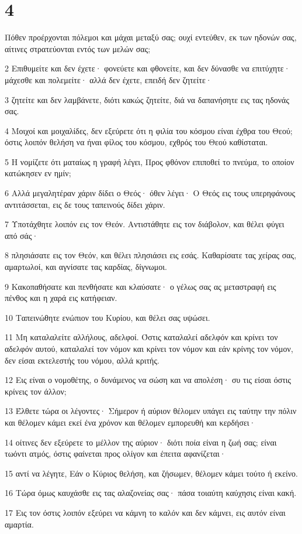\chapter{4}

\par Πόθεν προέρχονται πόλεμοι και μάχαι μεταξύ σας; ουχί εντεύθεν, εκ των ηδονών σας, αίτινες στρατεύονται εντός των μελών σας;
\par 2 Επιθυμείτε και δεν έχετε· φονεύετε και φθονείτε, και δεν δύνασθε να επιτύχητε· μάχεσθε και πολεμείτε· αλλά δεν έχετε, επειδή δεν ζητείτε·
\par 3 ζητείτε και δεν λαμβάνετε, διότι κακώς ζητείτε, διά να δαπανήσητε εις τας ηδονάς σας.
\par 4 Μοιχοί και μοιχαλίδες, δεν εξεύρετε ότι η φιλία του κόσμου είναι έχθρα του Θεού; όστις λοιπόν θελήση να ήναι φίλος του κόσμου, εχθρός του Θεού καθίσταται.
\par 5 Η νομίζετε ότι ματαίως η γραφή λέγει, Προς φθόνον επιποθεί το πνεύμα, το οποίον κατώκησεν εν ημίν;
\par 6 Αλλά μεγαλητέραν χάριν δίδει ο Θεός· όθεν λέγει· Ο Θεός εις τους υπερηφάνους αντιτάσσεται, εις δε τους ταπεινούς δίδει χάριν.
\par 7 Υποτάχθητε λοιπόν εις τον Θεόν. Αντιστάθητε εις τον διάβολον, και θέλει φύγει από σάς·
\par 8 πλησιάσατε εις τον Θεόν, και θέλει πλησιάσει εις εσάς. Καθαρίσατε τας χείρας σας, αμαρτωλοί, και αγνίσατε τας καρδίας, δίγνωμοι.
\par 9 Κακοπαθήσατε και πενθήσατε και κλαύσατε· ο γέλως σας ας μεταστραφή εις πένθος και η χαρά εις κατήφειαν.
\par 10 Ταπεινώθητε ενώπιον του Κυρίου, και θέλει σας υψώσει.
\par 11 Μη καταλαλείτε αλλήλους, αδελφοί. Όστις καταλαλεί αδελφόν και κρίνει τον αδελφόν αυτού, καταλαλεί τον νόμον και κρίνει τον νόμον και εάν κρίνης τον νόμον, δεν είσαι εκτελεστής του νόμου, αλλά κριτής.
\par 12 Εις είναι ο νομοθέτης, ο δυνάμενος να σώση και να απολέση· συ τις είσαι όστις κρίνεις τον άλλον;
\par 13 Έλθετε τώρα οι λέγοντες· Σήμερον ή αύριον θέλομεν υπάγει εις ταύτην την πόλιν και θέλομεν κάμει εκεί ένα χρόνον και θέλομεν εμπορευθή και κερδήσει·
\par 14 οίτινες δεν εξεύρετε το μέλλον της αύριον· διότι ποία είναι η ζωή σας; είναι τωόντι ατμός, όστις φαίνεται προς ολίγον και έπειτα αφανίζεται·
\par 15 αντί να λέγητε, Εάν ο Κύριος θελήση, και ζήσωμεν, θέλομεν κάμει τούτο ή εκείνο.
\par 16 Τώρα όμως καυχάσθε εις τας αλαζονείας σας· πάσα τοιαύτη καύχησις είναι κακή.
\par 17 Εις τον όστις λοιπόν εξεύρει να κάμνη το καλόν και δεν κάμνει, εις αυτόν είναι αμαρτία.

